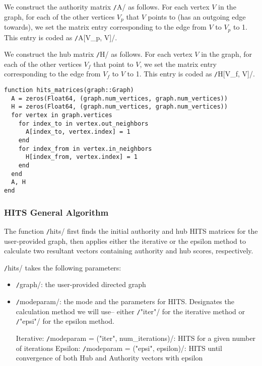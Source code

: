 \documentclass[12pt, titlepage, twoside]{amsart}
\theoremstyle{remark}
\begin{document}
We construct the authority matrix \texttt/A/ as follows.
For each vertex $V$ in the graph, for each of the other vertices $V_p$ that $V$ points to
(has an outgoing edge towards),
we set the matrix entry corresponding to the edge from $V$ to $V_p$ to 1.
This entry is coded as \texttt/A[V_p, V]/.

We construct the hub matrix \texttt/H/ as follows.
For each vertex $V$ in the graph, for each of the other vertices $V_f$ that point to $V$,
we set the matrix entry corresponding to the edge from $V_f$ to $V$ to 1.
This entry is coded as \texttt/H[V_f, V]/.

\begin{verbatim}
function hits_matrices(graph::Graph)
  A = zeros(Float64, (graph.num_vertices, graph.num_vertices))
  H = zeros(Float64, (graph.num_vertices, graph.num_vertices))
  for vertex in graph.vertices
    for index_to in vertex.out_neighbors
      A[index_to, vertex.index] = 1
    end
    for index_from in vertex.in_neighbors
      H[index_from, vertex.index] = 1
    end
  end
  A, H
end
\end{verbatim}

\subsubsection{HITS General Algorithm}

The function \texttt/hits/ first finds the initial authority and hub HITS matrices
for the user-provided graph,
then applies either the iterative or the epsilon method to calculate
two resultant vectors containing authority and hub scores, respectively.

\texttt/hits/ takes the following parameters:

\begin{itemize}[label={}]
\item \texttt/graph/: the user-provided directed graph

\item \texttt/modeparam/: the mode and the parameters for HITS.
Designates the calculation method we will use-- 
either \texttt/"iter"/ for the iterative method or \texttt/"epsi"/ for the epsilon method.

Iterative: \texttt/modeparam = ("iter", num_iterations)/:
HITS for a given number of iterations
Epsilon: \texttt/modeparam = ("epsi", epsilon)/: HITS until convergence of
both Hub and Authority vectors with epsilon
\end{itemize}
\end{document}
